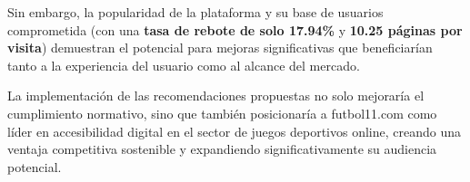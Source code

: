 \documentclass{article}
\begin{document}
	\noindent
	Sin embargo, la popularidad de la plataforma y su base de usuarios comprometida (con una \textbf{tasa de rebote de solo 17.94\%} y \textbf{10.25 páginas por visita}) demuestran el potencial para mejoras significativas que beneficiarían tanto a la experiencia del usuario como al alcance del mercado.

	\noindent
	La implementación de las recomendaciones propuestas no solo mejoraría el cumplimiento normativo, sino que también posicionaría a futbol11.com como líder en accesibilidad digital en el sector de juegos deportivos online, creando una ventaja competitiva sostenible y expandiendo significativamente su audiencia potencial.
\end{document}
